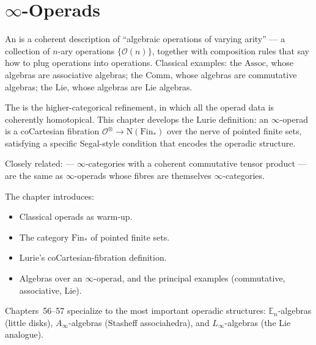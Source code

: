 
\chapter{$\infty$-Operads}

\begin{overviewbox}
An  is a coherent description of ``algebraic operations of
varying arity'' — a collection of $n$-ary operations $\{\mathcal{O}(n)\}$,
together with composition rules that say how to plug operations into
operations. Classical examples: the  $\mathrm{Assoc}$,
whose algebras are associative algebras; the 
$\mathrm{Comm}$, whose algebras are commutative algebras; the
 $\mathrm{Lie}$, whose algebras are Lie algebras.

The  is the higher-categorical refinement, in
which all the operad data is coherently homotopical. This chapter
develops the Lurie definition: an $\infty$-operad is a coCartesian
fibration $\mathcal{O}^\otimes \to \mathrm{N}(\mathrm{Fin}_*)$ over
the nerve of pointed finite sets, satisfying a specific Segal-style
condition that encodes the operadic structure.

Closely related:  —
$\infty$-categories with a coherent commutative tensor product — are
the same as $\infty$-operads whose fibres are themselves $\infty$-categories.

The chapter introduces:
\begin{itemize}
  \item Classical operads as warm-up.
  \item The category $\mathrm{Fin}_*$ of pointed finite sets.
  \item Lurie's coCartesian-fibration definition.
  \item Algebras over an $\infty$-operad, and the principal examples
        (commutative, associative, Lie).
\end{itemize}

Chapters~56--57 specialize to the most important operadic structures:
$\mathbb{E}_n$-algebras (little disks), $A_\infty$-algebras (Stasheff
associahedra), and $L_\infty$-algebras (the Lie analogue).
\end{overviewbox}


